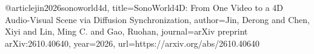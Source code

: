 @article{jin2026sonoworld4d,
  title={SonoWorld4D: From One Video to a 4D Audio-Visual Scene via Diffusion Synchronization},
  author={Jin, Derong and Chen, Xiyi and Lin, Ming C. and Gao, Ruohan},
  journal={arXiv preprint arXiv:2610.40640},
  year={2026},
  url={https://arxiv.org/abs/2610.40640}
}
